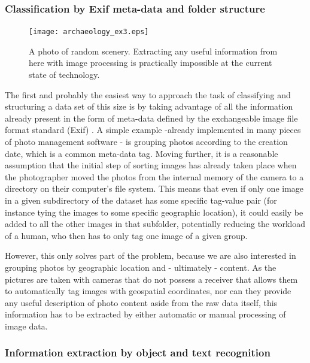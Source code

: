 \documentclass [12pt,a4paper]{report}
\begin{document}
\subsubsection{Classification by Exif meta-data and folder structure}

\begin{center}
\begin{figure}[h]
\centering
\texttt{[image: archaeology\_ex3.eps]} %
\caption[A photo of random scenery]{A photo of random scenery. Extracting any useful information from here with image processing is practically impossible at the current state of technology. }
\label{archaeology_ex3}
\end{figure}
\end{center}

The first and probably the easiest way to approach the task of classifying and structuring a data set of this size is by taking advantage of all the information already present in the form of meta-data defined by the exchangeable image file format standard (Exif) \cite{japan2002jeita}. A simple example -already implemented in many pieces of photo management software - is grouping photos according to the creation date, which is a common meta-data tag. Moving further, it is a reasonable assumption that the initial step of sorting images has already taken place when the photographer moved the photos from the internal memory of the camera to a directory on their computer's file system. This means that even if only one image in a given subdirectory of the dataset has some specific tag-value pair (for instance tying the images to some specific geographic location), it could easily be added to all the other images in that subfolder, potentially reducing the workload of a human, who then has to only tag one image of a given group.

However, this only solves part of the problem, because we are also interested in grouping photos by geographic location and - ultimately - content. As the pictures are taken with cameras that do not possess a receiver that allows them to automatically tag images with geospatial coordinates, nor can they provide any useful description of photo content aside from the raw data itself, this information has to be extracted by either automatic or manual processing of image data. 

\subsubsection{Information extraction by object and text recognition}
\end{document}
